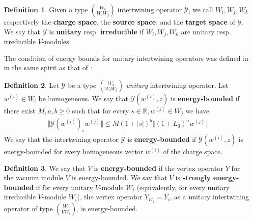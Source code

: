 \documentclass[11pt,b5paper,notitlepage]{article}
\theoremstyle{definition}
\newtheorem{df}{Definition}[section]
\theoremstyle{plain}
\newcommand{\mc}{\mathcal}
\newcommand{\Rbb}{\mathbb R}
\numberwithin{equation}{section}
\begin{document}
\begin{df}
Given a type $W_k\choose W_iW_j$ intertwining operator $\mc Y$, we call $W_i,W_j,W_k$ respectively the \textbf{charge space}, the \textbf{source space}, and the \textbf{target space} of $\mc Y$. We say that $\mc Y$ is \textbf{unitary} resp. \textbf{irreducible} if $W_i,W_j,W_k$ are unitary resp. irreducible $V$-modules.
\end{df}

The condition of energy bounds for unitary intertwining operators was defined in \cite[Sec. 3.1]{Gui19a} in the same spirit as that of \cite{CKLW18}: 
\begin{df}
Let $\mc Y$ be a type $W_k\choose W_iW_j$ \textit{unitary} intertwining operator. Let $w^{(i)}\in W_i$ be homogeneous. We say that $\mc Y(w^{(i)},z)$ is \textbf{energy-bounded} if there exist $M,a,b\geq0$ such that for every $s\in\Rbb,w^{(j)}\in W_j$ we have
\begin{align*}
\Vert \mc Y(w^{(i)})_sw^{(j)}\Vert\leq M(1+|s|)^b\Vert(1+L_0)^a w^{(j)}\Vert
\end{align*}
We say that the intertwining operator $\mc Y$ is \textbf{energy-bounded} if $\mc Y(w^{(i)},z)$ is energy-bounded for every homogeneous vector $w^{(i)}$ of the charge space.
\end{df}



\begin{df}
We say that $V$ is \textbf{energy-bounded} if the vertex operator $Y$ for the vacuum module $V$ is energy-bounded. We say that $V$ is \textbf{strongly energy-bounded} if for every unitary $V$-module $W_i$ (equivalently, for every unitary irreducible $V$-module $W_i$), the vertex operator $Y_{W_i}=Y_i$, as a unitary intertwining operator of type $W_i\choose V W_i$, is energy-bounded.
\end{df}
\end{document}
